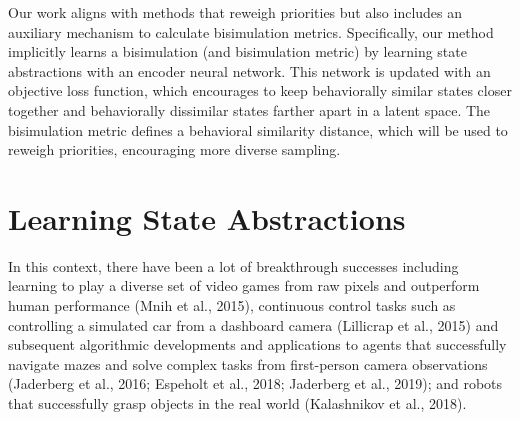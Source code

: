 Our work aligns with methods that reweigh priorities but also includes an auxiliary mechanism to calculate bisimulation metrics. Specifically, our method implicitly learns a bisimulation (and bisimulation metric) by learning state abstractions with an encoder neural network. This network is updated with an objective loss function, which encourages to keep behaviorally similar states closer together and behaviorally dissimilar states farther apart in a latent space. The bisimulation metric defines a behavioral similarity distance, which will be used to reweigh priorities, encouraging more diverse sampling.



\section{Learning State Abstractions}

In this context, there have been a lot of breakthrough successes including learning to play a diverse set of video games from raw pixels and outperform human performance (Mnih et al., 2015), continuous control tasks such as controlling a simulated car from a dashboard camera (Lillicrap et al., 2015) and subsequent algorithmic developments and applications to agents that successfully navigate mazes and solve complex tasks from first-person camera observations (Jaderberg et al., 2016; Espeholt et al., 2018; Jaderberg et al., 2019); and robots that successfully grasp objects in the real world (Kalashnikov et al., 2018).

